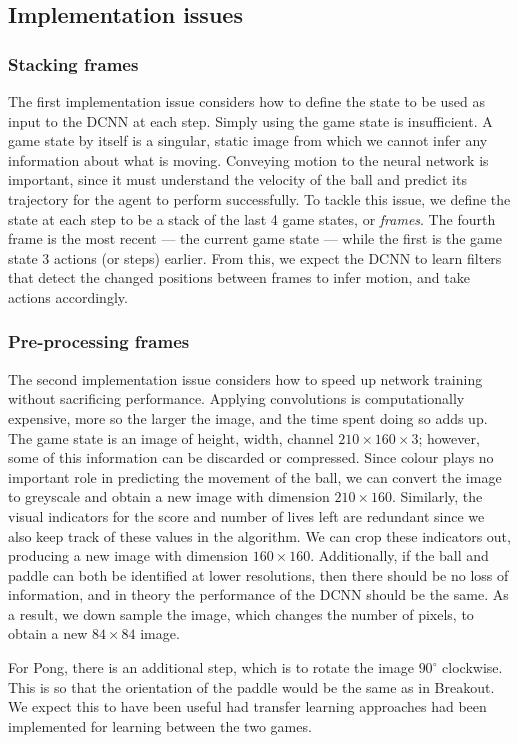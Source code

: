 \documentclass[12pt,a4paper]{article}
\begin{document}
\subsection{Implementation issues}
\subsubsection{Stacking frames}
The first implementation issue considers how to define the state to be used as input to the DCNN at each step. Simply using the game state is insufficient. A game state by itself is a singular, static image from which we cannot infer any information about what is moving. Conveying motion to the neural network is important, since it must understand the velocity of the ball and predict its trajectory for the agent to perform successfully. To tackle this issue, we define the state at each step to be a stack of the last 4 game states, or \emph{frames}. The fourth frame is the most recent --- the current game state --- while the first is the game state 3 actions (or steps) earlier. From this, we expect the DCNN to learn filters that detect the changed positions between frames to infer motion, and take actions accordingly.

\subsubsection{Pre-processing frames}
The second implementation issue considers how to speed up network training without sacrificing performance. Applying convolutions is computationally expensive, more so the larger the image, and the time spent doing so adds up. The game state is an image of height, width, channel $210 \times 160 \times 3$; however, some of this information can be discarded or compressed. Since colour plays no important role in predicting the movement of the ball, we can convert the image to greyscale and obtain a new image with dimension $210 \times 160$. Similarly, the visual indicators for the score and number of lives left are redundant since we also keep track of these values in the algorithm. We can crop these indicators out, producing a new image with dimension $160 \times 160$. Additionally, if the ball and paddle can both be identified at lower resolutions, then there should be no loss of information, and in theory the performance of the DCNN should be the same. As a result, we down sample the image, which changes the number of pixels, to obtain a new $84 \times 84$ image. 

For Pong, there is an additional step, which is to rotate the image $90^{\circ}$ clockwise. This is so that the orientation of the paddle would be the same as in Breakout. We expect this to have been useful had transfer learning approaches had been implemented for learning between the two games.
\end{document}
